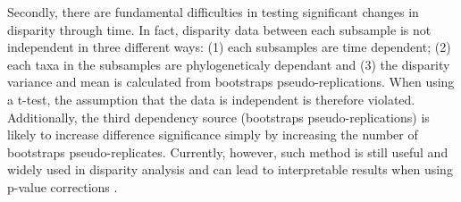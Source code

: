 \documentclass[12pt,letterpaper]{article}
\begin{document}
Secondly, there are fundamental difficulties in testing significant changes in disparity through time.
In fact, disparity data between each subsample is not independent in three different ways: (1) each subsamples are time dependent; (2) each taxa in the subsamples are phylogeneticaly dependant and (3) the disparity variance and mean is calculated from bootstraps pseudo-replications.
When using a t-test, the assumption that the data is independent is therefore violated.
Additionally, the third dependency source (bootstraps pseudo-replications) is likely to increase difference significance simply by increasing the number of bootstraps pseudo-replicates.
Currently, however, such method is still useful and widely used in disparity analysis \citep[e.g.][]{anderson2012using,zelditch2012geometric,smith2014joined} and can lead to interpretable results when using p-value corrections \citep[e.g. Holm-Bonferonni][]{holm1979simple}.

\end{document}
